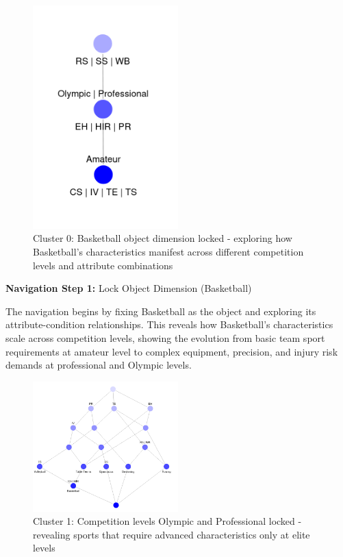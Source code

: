 \documentclass{article}
\begin{document}
\begin{figure}[htbp]
  \centering
  \includegraphics[width=0.5\textwidth]{cluster_0.png}
  \caption{Cluster 0: Basketball object dimension locked - exploring how Basketball's characteristics manifest across different competition levels and attribute combinations}
  \label{fig:cluster_0}
\end{figure}

\textbf{Navigation Step 1:} Lock Object Dimension (Basketball)

The navigation begins by fixing Basketball as the object and exploring its attribute-condition relationships. This reveals how Basketball's characteristics scale across competition levels, showing the evolution from basic team sport requirements at amateur level to complex equipment, precision, and injury risk demands at professional and Olympic levels.

\newpage
\begin{figure}[htbp]
  \centering
  \includegraphics[width=0.5\textwidth]{cluster_1.png}
  \caption{Cluster 1: Competition levels Olympic and Professional locked - revealing sports that require advanced characteristics only at elite levels}
  \label{fig:cluster_1}
\end{figure}
\end{document}
